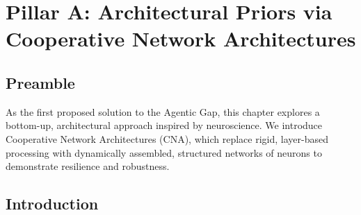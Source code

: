 \chapter{Pillar A: Architectural Priors via Cooperative Network Architectures}
\label{ch:cna}

\section*{Preamble}
As the first proposed solution to the Agentic Gap, this chapter explores a bottom-up, architectural approach inspired by neuroscience. We introduce Cooperative Network Architectures (CNA), which replace rigid, layer-based processing with dynamically assembled, structured networks of neurons to demonstrate resilience and robustness.

\section{Introduction}
\blindtext
